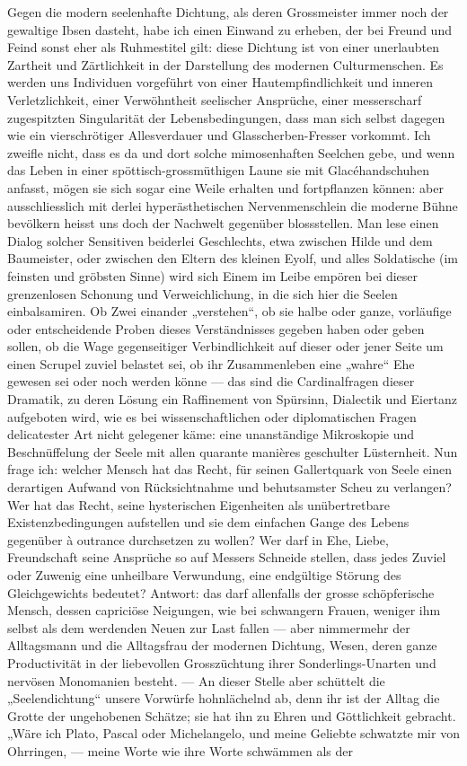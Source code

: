 Gegen die modern seelenhafte Dichtung, als deren Grossmeister immer noch der gewaltige Ibsen dasteht, habe ich einen Einwand zu erheben, der bei Freund und Feind sonst eher als Ruhmestitel gilt: diese Dichtung ist von einer unerlaubten Zartheit und Zärtlichkeit in der Darstellung des modernen Culturmenschen. Es werden uns Individuen vorgeführt von einer Hautempfindlichkeit und inneren Verletzlichkeit, einer Verwöhntheit seelischer Ansprüche, einer messerscharf zugespitzten Singularität der Lebensbedingungen, dass man sich selbst dagegen wie ein vierschrötiger Allesverdauer und Glasscherben-Fresser vorkommt. Ich zweifle nicht, dass es da und dort solche mimosenhaften Seelchen gebe, und wenn das Leben in einer spöttisch-grossmüthigen Laune sie mit Glacéhandschuhen anfasst, mögen sie sich sogar eine Weile erhalten und fortpflanzen können: aber ausschliesslich mit derlei hyperästhetischen Nervenmenschlein die moderne Bühne bevölkern heisst uns doch der Nachwelt gegenüber blossstellen. Man lese einen Dialog solcher Sensitiven beiderlei Geschlechts, etwa zwischen Hilde und dem Baumeister, oder zwischen den Eltern des kleinen Eyolf, und alles Soldatische (im feinsten und gröbsten Sinne) wird sich Einem im Leibe empören bei dieser grenzenlosen Schonung und Verweichlichung, in die sich hier die Seelen einbalsamiren. Ob Zwei einander „verstehen“, ob sie halbe oder ganze, vorläufige oder entscheidende Proben dieses Verständnisses gegeben haben oder geben sollen, ob die Wage gegenseitiger Verbindlichkeit auf dieser oder jener Seite um einen Scrupel zuviel belastet sei, ob ihr Zusammenleben eine „wahre“ Ehe gewesen sei oder noch werden könne — das sind die Cardinalfragen dieser Dramatik, zu deren Lösung ein Raffinement von Spürsinn, Dialectik und Eiertanz aufgeboten wird, wie es bei wissenschaftlichen oder diplomatischen Fragen delicatester Art nicht gelegener käme: eine unanständige Mikroskopie und Beschnüffelung der Seele mit allen quarante manières geschulter Lüsternheit. Nun frage ich: welcher Mensch hat das Recht, für seinen Gallertquark von Seele einen derartigen Aufwand von Rücksichtnahme und behutsamster Scheu zu verlangen? Wer hat das Recht, seine hysterischen Eigenheiten als unübertretbare Existenzbedingungen aufstellen und sie dem einfachen Gange des Lebens gegenüber à outrance durchsetzen zu wollen? Wer darf in Ehe, Liebe, Freundschaft seine Ansprüche so auf Messers Schneide stellen, dass jedes Zuviel oder Zuwenig eine unheilbare Verwundung, eine endgültige Störung des Gleichgewichts bedeutet? Antwort: das darf allenfalls der grosse schöpferische Mensch, dessen capriciöse Neigungen, wie bei schwangern Frauen, weniger ihm selbst als dem werdenden Neuen zur Last fallen — aber nimmermehr der Alltagsmann und die Alltagsfrau der modernen Dichtung, Wesen, deren ganze Productivität in der liebevollen Grosszüchtung ihrer Sonderlings-Unarten und nervösen Monomanien besteht. — An dieser Stelle aber schüttelt die „Seelendichtung“ unsere Vorwürfe hohnlächelnd ab, denn ihr ist der Alltag die Grotte der ungehobenen Schätze; sie hat ihn zu Ehren und Göttlichkeit gebracht. „Wäre ich Plato, Pascal oder Michelangelo, und meine Geliebte schwatzte mir von Ohrringen, — meine Worte wie ihre Worte schwämmen als der 